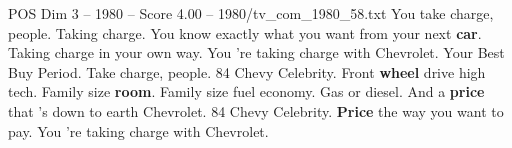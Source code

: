 \begin{textsample}{POS Dim 3 – 1980 – Score 4.00 – 1980/tv\_com\_1980\_58.txt}  \label{ex:f3_pos_051}
You take charge, people.
Taking charge.
You know exactly what you want from your next \textbf{car}.
Taking charge in your own way.
You 're taking charge with Chevrolet.
Your Best Buy Period.
Take charge, people. 84 Chevy Celebrity.
Front \textbf{wheel} drive high tech.
Family size \textbf{room}.
Family size fuel economy.
Gas or diesel.
And a \textbf{price} that 's down to earth Chevrolet. 84 Chevy Celebrity. \textbf{Price} the way you want to pay.
You 're taking charge with Chevrolet.

\end{textsample}
